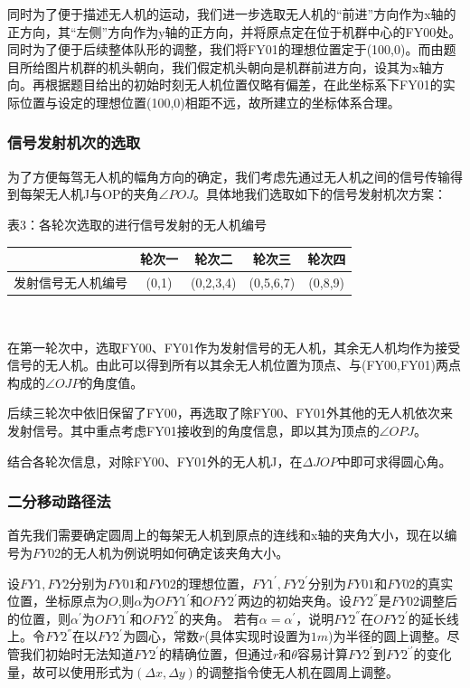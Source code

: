 \documentclass{ctexart}
\begin{document}
同时为了便于描述无人机的运动，我们进一步选取无人机的“前进”方向作为x轴的正方向，其“左侧”方向作为y轴的正方向，并将原点定在位于机群中心的FY00处。同时为了便于后续整体队形的调整，我们将FY01的理想位置定于(100,0)。而由题目所给图片机群的机头朝向，我们假定机头朝向是机群前进方向，设其为x轴方向。再根据题目给出的初始时刻无人机位置仅略有偏差，在此坐标系下FY01的实际位置与设定的理想位置(100,0)相距不远，故所建立的坐标体系合理。

  \subsubsection{信号发射机次的选取}
  为了方便每驾无人机的幅角方向的确定，我们考虑先通过无人机之间的信号传输得到每架无人机J与OP的夹角$\angle POJ$。具体地我们选取如下的信号发射机次方案：

  \begin{center}
  表3：各轮次选取的进行信号发射的无人机编号
  ~\\
    \begin{tabular}{|c|c|c|c|c|}
        \hline
        &轮次一&轮次二&轮次三&轮次四\\ 
        \hline
        发射信号无人机编号&(0,1)&(0,2,3,4)&(0,5,6,7)&(0,8,9)\\
        \hline
    \end{tabular}\\
  \end{center}

在第一轮次中，选取FY00、FY01作为发射信号的无人机，其余无人机均作为接受信号的无人机。由此可以得到所有以其余无人机位置为顶点、与(FY00,FY01)两点构成的$\angle OJP$的角度值。

后续三轮次中依旧保留了FY00，再选取了除FY00、FY01外其他的无人机依次来发射信号。其中重点考虑FY01接收到的角度信息，即以其为顶点的$\angle OPJ$。

结合各轮次信息，对除FY00、FY01外的无人机J，在$\Delta JOP$中即可求得圆心角。

\subsubsection{二分移动路径法}

首先我们需要确定圆周上的每架无人机到原点的连线和x轴的夹角大小，现在以编号为$FY02$的无人机为例说明如何确定该夹角大小。

  设$FY1,FY2$分别为$FY01$和$FY02$的理想位置，$FY1^{'},FY2^{'}$分别为$FY01$和$FY02$的真实位置，坐标原点为$O$,则$\alpha$为$OFY1^{'}$和$OFY2^{'}$两边的初始夹角。设$FY2^{''}$是$FY02$调整后的位置，则$\alpha^{'}$为$OFY1^{'}$和$OFY2^{''}$的夹角。
  若有$\alpha = \alpha^{'}$，说明$FY2^{''}$在$OFY2^{'}$的延长线上。令$FY2^{''}$在以$FY2^{'}$为圆心，常数$r$(具体实现时设置为$1m$)为半径的圆上调整。尽管我们初始时无法知道$FY2^{'}$的精确位置，但通过$r$和$\theta$容易计算$FY2^{'}$到$FY2^{‘'}$的变化量，故可以使用形式为$(\Delta x,\Delta y)$的调整指令使无人机在圆周上调整。
  
\end{document}
